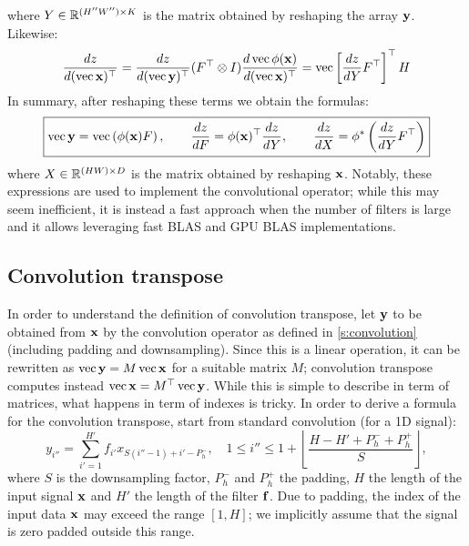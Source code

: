 where $Y\in\mathbb{R}^{(H''W'')\times K}$ is the matrix obtained by reshaping the array $\mathbf{y}$. Likewise:
\[
\frac{dz}{d(\operatorname{vec} \mathbf{x})^\top}
=
\frac{dz}{d(\operatorname{vec}\mathbf{y})^\top}
(F^\top \otimes I)
\frac{d\operatorname{vec} \phi(\mathbf{x})}{d(\operatorname{vec} \mathbf{x})^\top}
=
\operatorname{vec}\left[ 
\frac{dz}{dY}
F^\top
\right]^\top
H
\]
In summary, after reshaping these terms we obtain the formulas:
\[
\boxed{
	\operatorname{vec}\mathbf{y} = 
	\operatorname{vec}\left(\phi(\mathbf{x}) F\right),
	\qquad
	\frac{dz}{dF}
	=
	\phi(\mathbf{x})^\top\frac{d z}{d Y},
	\qquad
	\frac{d z}{d X}
	=
	\phi^*\left(
	\frac{d z}{d Y}F^\top
	\right)
}
\]
where $X\in\mathbb{R}^{(HW)\times D}$ is the matrix obtained by reshaping $\mathbf{x}$. Notably, these expressions are used to implement the convolutional operator; while this may seem inefficient, it is instead a fast approach when the number of filters is large and it allows leveraging fast BLAS and GPU BLAS implementations.

\subsection{Convolution transpose}\label{s:impl-convolution-transpose}

In order to understand the definition of convolution transpose, let $\mathbf{y}$ to be obtained from $\mathbf{x}$ by the convolution operator as defined in \cref{s:convolution} (including padding and downsampling).  Since this is a linear operation, it can be rewritten as $\operatorname{vec} \mathbf{y} = M \operatorname{vec}\mathbf{x}$ for a suitable matrix $M$; convolution transpose computes instead $\operatorname{vec} \mathbf{x} = M^\top \operatorname{vec} \mathbf{y}$.  While this is simple to describe in term of matrices, what happens in term of indexes is tricky. In order to derive a formula for the convolution transpose, start from standard convolution (for a 1D signal):
\[
y_{i''} = \sum_{i'=1}^{H'} f_{i'} x_{S (i''-1) + i' - P_h^-}, 
\quad
1 \leq i'' \leq 1 + \left\lfloor \frac{H - H' + P_h^- + P_h^+}{S} \right\rfloor,
\]
where $S$ is the downsampling factor, $P_h^-$ and $P_h^+$ the padding, $H$ the length of the input signal $\mathbf{x}$ and $H'$ the length of the filter $\mathbf{f}$. Due to padding, the index of the input data $\mathbf{x}$ may exceed the range $[1,H]$; we implicitly assume that the signal is zero padded outside this range.

